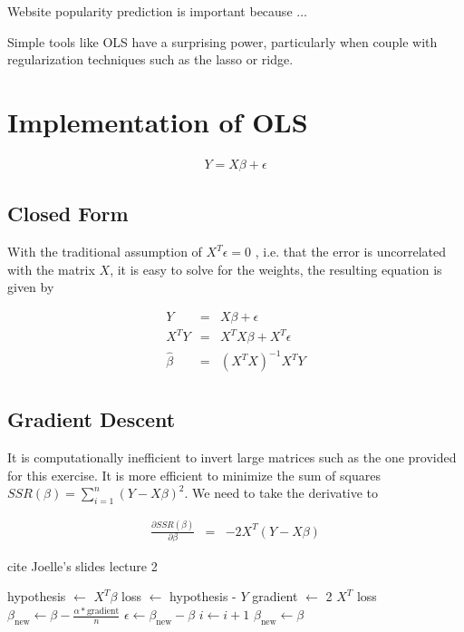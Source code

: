 \documentclass[conference]{IEEEtran}
\begin{document}
Website popularity prediction is important because $\ldots$

Simple tools like OLS have a surprising power, particularly when couple with
regularization techniques such as the lasso or ridge.

\section{Implementation of OLS}

\begin{eqnarray}
  Y = X \beta + \epsilon
\end{eqnarray}

\subsection{Closed Form}

With the traditional assumption of $X^T \epsilon = 0$
\cite{davidson2004econometrics}, i.e. that the error is 
uncorrelated with the matrix $X$, it is easy to solve for the weights, the
resulting equation is given by

\begin{eqnarray}
  Y &=& X \beta + \epsilon \\
  X^T Y &=& X^T X \beta + X^T \epsilon \\
  \hat{\beta} &=& (X^TX)^{-1}X^TY \\
\end{eqnarray}


\subsection{Gradient Descent}

It is computationally inefficient to invert large matrices such as the one
provided for this exercise. It is more efficient to minimize the sum of squares
$SSR(\beta) = \sum_{i=1}^n (Y-X \beta)^2$. We need to take the derivative to 

\begin{eqnarray}
  \frac{\partial SSR(\beta)}{\partial \beta} &=& -2 X^T (Y-X \beta)
\end{eqnarray}

cite Joelle's slides lecture 2

\begin{algorithmic}
    \State hypothesis $\leftarrow$ $X^T \beta$
    \State loss $\leftarrow$ hypothesis - $Y$
    \State gradient $\leftarrow$ 2 $X^T$ loss
    \State $\beta_{\text{new}} \leftarrow \beta - \frac{\alpha *
      \text{gradient}}{n}$  
    \State $\epsilon \leftarrow \beta_{\text{new}} - \beta$
    \State $i \leftarrow i + 1$
    \State $\beta_{\text{new}} \leftarrow \beta$
\EndWhile
\end{algorithmic}
\end{document}
